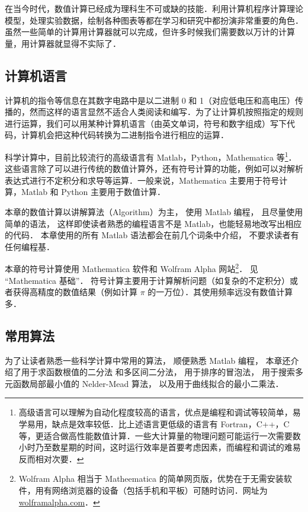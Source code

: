 
在当今时代，数值计算已经成为理科生不可或缺的技能．利用计算机程序计算理论模型，处理实验数据，绘制各种图表等都在学习和研究中都扮演非常重要的角色．虽然一些简单的计算用计算器就可以完成，但许多时候我们需要数以万计的计算量，用计算器就显得不实际了．

\subsection{计算机语言}
计算机的指令等信息在其数字电路中是以二进制 0 和 1（对应低电压和高电压）传播的，然而这样的语言显然不适合人类阅读和编写．为了让计算机按照指定的规则进行运算，我们可以用某种计算机语言（由英文单词，符号和数字组成）写下代码，计算机会把这种代码转换为二进制指令进行相应的运算．

科学计算中，目前比较流行的高级语言有 Matlab，Python，Mathematica 等\footnote{高级语言可以理解为自动化程度较高的语言，优点是编程和调试等较简单，易学易用，缺点是效率较低．比上述语言更低级的语言有 Fortran，C++，C 等，更适合做高性能数值计算．一些大计算量的物理问题可能运行一次需要数小时乃至数星期的时间，这时运行效率是首要考虑因素，而编程和调试的难易反而相对次要．}．这些语言除了可以进行传统的数值计算外，还有符号计算的功能，例如可以对解析表达式进行不定积分和求导等运算．一般来说，Mathematica 主要用于符号计算，Matlab 和 Python 主要用于数值计算．

本章的数值计算以讲解算法（Algorithm）为主， 使用 Matlab 编程， 且尽量使用简单的语法， 这样即使读者熟悉的编程语言不是 Matlab，也能轻易地改写出相应的代码． 本章使用的所有 Matlab 语法都会在前几个词条中介绍， 不要求读者有任何编程基．

本章的符号计算使用 Mathematica 软件和 Wolfram Alpha 网站\footnote{Wolfram Alpha 相当于 Matheematica 的简单网页版，优势在于无需安装软件，用有网络浏览器的设备（包括手机和平板）可随时访问．网址为 \href{https://www.wolframalpha.com/}{wolframalpha.com}．}． 见 “Mathematica 基础”．%
符号计算主要用于计算解析问题（如复杂的不定积分）或者获得高精度的数值结果（例如计算 $\pi$ 的一万位）．其使用频率远没有数值计算多．

\subsection{常用算法}
为了让读者熟悉一些科学计算中常用的算法， 顺便熟悉 Matlab 编程， 本章还介绍了用于求函数根值的二分法 和多区间二分法， 用于排序的冒泡法， 用于搜索多元函数局部最小值的 Nelder-Mead 算法， 以及用于曲线拟合的最小二乘法．%

